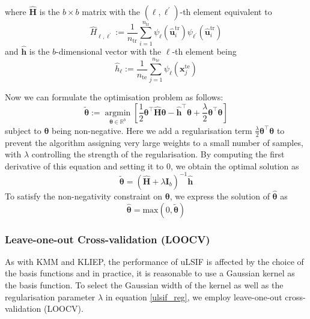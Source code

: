 \documentclass[a4paper,12pt]{article}
\begin{document}
where $\widehat{\boldsymbol{H}}$ is the $b \times b$ matrix with the $\left(\ell, \ell^{\prime}\right)$-th element equivalent to
\begin{equation*}
\widehat{H}_{\ell, \ell^{\prime}}:=\frac{1}{n_{\mathrm{tr}}} \sum_{i=1}^{n_{\mathrm{tr}}} \psi_{\ell}\left(\widehat{\boldsymbol{u}}_{i}^{\mathrm{tr}}\right) \psi_{\ell^{\prime}}\left(\widehat{\boldsymbol{u}}_{i}^{\mathrm{tr}}\right)
\end{equation*}
and $\widehat{\boldsymbol{h}}$ is the $b$-dimensional vector with the $\ell$-th element being
\begin{equation*}
\widehat{h}_{\ell}:=\frac{1}{n_{\mathrm{te}}} \sum_{j=1}^{n_{\mathrm{te}}} \psi_{\ell}\left({\boldsymbol{x}}_{j}^{\mathrm{te}}\right)
\end{equation*}

Now we can formulate the optimisation problem as follows:
\begin{equation} \label{ulsif_reg}
\widetilde{\boldsymbol{\theta}}:=\underset{\boldsymbol{\theta} \in \mathbb{R}^{b}}{\operatorname{argmin}}\left[\frac{1}{2} \boldsymbol{\theta}^{\top} \widehat{\boldsymbol{H}} \boldsymbol{\theta}-\widehat{\boldsymbol{h}}^{\top} \boldsymbol{\theta}+\frac{\lambda}{2} \boldsymbol{\theta}^{\top} \boldsymbol{\theta}\right]
\end{equation}
subject to $\boldsymbol{\theta}$ being non-negative. Here we add a regularisation term $\frac{\lambda}{2} \boldsymbol{\theta}^{\top} \boldsymbol{\theta}$ to prevent the algorithm assigning very large weights to a small number of samples, with $\lambda$ controlling the strength of the regularisation. By computing the first derivative of this equation and setting it to 0, we obtain the optimal solution as
\begin{equation*}
\widetilde{\boldsymbol{\theta}} = \left(\widehat{\boldsymbol{H}}+\lambda \boldsymbol{I}_{b}\right)^{-1} \widehat{\boldsymbol{h}}
\end{equation*}
To satisfy the non-negativity constraint on $\boldsymbol{\theta}$, we express the solution of $\widehat{\boldsymbol{\theta}}$ as
\begin{equation*}
\widehat{\boldsymbol{\theta}} = \text{max}\left( 0, \widetilde{\boldsymbol{\theta}} \right)
\end{equation*}


\subsubsection{Leave-one-out Cross-validation (LOOCV)}
As with KMM and KLIEP, the performance of uLSIF is affected by the choice of the basis functions and in practice, it is reasonable to use a Gaussian kernel as the basis function. To select the Gaussian width of the kernel as well as the regularisation parameter $\lambda$ in equation \ref{ulsif_reg}, we employ leave-one-out cross-validation (LOOCV). 
\end{document}
